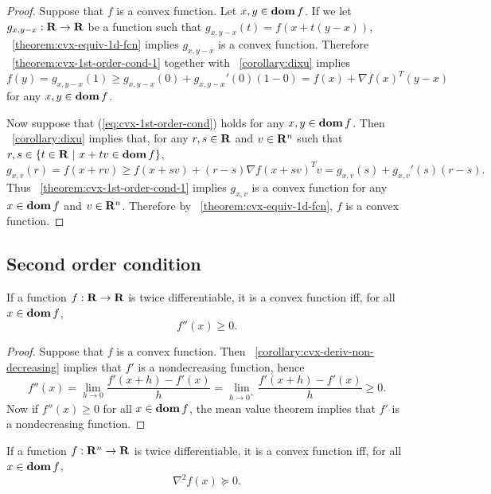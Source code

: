\documentclass[10pt, twoside]{book}   	%
\begin{document}
\begin{proof}
Suppose that $f$ is a convex function.
Let $x,y\in\mathop{\bf dom} f$.
If we let $g_{x,y-x}:\mathbf{R}\to\mathbf{R}$ be a function such that $g_{x,y-x}(t) = f(x+t(y-x))$,
\theoremname~\ref{theorem:cvx-equiv-1d-fcn} implies $g_{x,y-x}$ is a convex function.
Therefore \theoremname~\ref{theorem:cvx-1st-order-cond-1} together with \corollaryname~\ref{corollary:dixu}
implies
\[
f(y) = g_{x,y-x}(1) \geq g_{x,y-x}(0) + g_{x,y-x}'(0) (1-0)
= f(x) + \nabla f(x) ^T (y-x)
\]
for any $x,y \in \mathop{\bf dom} f$.

Now suppose that (\ref{eq:cvx-1st-order-cond}) holds for any $x,y \in \mathop{\bf dom} f$.
Then \corollaryname~\ref{corollary:dixu} implies that,
for any $r,s\in\mathbf{R}$ and $v\in\mathbf{R}^n$ such that $r,s\in\{t\in\mathbf{R}~|~x+tv\in\mathop{\bf dom} f\}$,
\[
g_{x,v}(r) = f(x+rv) \geq f(x+sv) + (r-s) \nabla f(x+sv)^T v = g_{x,v}(s) + g_{x,v}'(s)(r-s).
\]
Thus \theoremname~\ref{theorem:cvx-1st-order-cond-1} implies
$g_{x,v}$ is a convex function for any $x\in\mathop{\bf dom} f$ and $v\in\mathbf{R}^n$.
Therefore by \theoremname~\ref{theorem:cvx-equiv-1d-fcn}, $f$ is a convex function.
\end{proof}

\subsection{Second order condition}

\begin{theorem}
\label{theorem:cvx-2nd-order-cond-1}
If a function $f:\mathbf{R}\to\mathbf{R}$ is twice differentiable, it is a convex function iff, for all $x \in \mathop{\bf dom} f$,
\begin{equation}
\label{eq:cvx-2nd-order-cond-1}
        f''(x) \geq 0.
\end{equation}
\end{theorem}

\begin{proof}
Suppose that $f$ is a convex function.
Then \corollaryname~\ref{corollary:cvx-deriv-non-decreasing} implies that $f'$ is a nondecreasing function,
hence
\[
f''(x)
= \lim_{h\to0} \frac{f'(x+h) - f'(x)}{h}
= \lim_{h\to0^+} \frac{f'(x+h) - f'(x)}{h} \geq 0.
\]
Now if $f''(x)\geq0$ for all $x\in\mathop{\bf dom} f$, the mean value theorem implies that $f'$ is a nondecreasing function.
\end{proof}


\begin{theorem}
\label{theorem:cvx-2nd-order-cond}
If a function $f:\mathbf{R}^n\to\mathbf{R}$ is twice differentiable, it is a convex function iff, for all $x \in \mathop{\bf dom} f$,
\begin{equation}
\label{eq:cvx-2nd-order-cond}
        \nabla^2 f(x) \succeq 0.
\end{equation}
\end{theorem}
\end{document}
